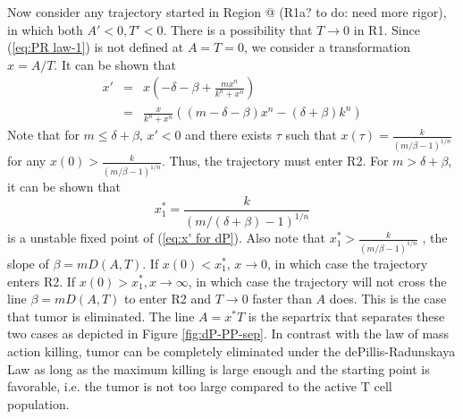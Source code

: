 \documentclass[review,authoryear]{elsarticle}
\makeatletter
\newcommand*{\rom}[1]{\expandafter\@slowromancap\romannumeral #1@}
\makeatother
\begin{document}
Now consider any trajectory started in Region \rom{1} (R1a? to do: need more rigor),
in which both $A'<0,T'<0$. There is a possibility that $T\to0$ in
R1. Since (\ref{eq:PR law-1}) is not defined at $A=T=0$, we consider
a transformation $x=A/T$. It can be shown that 
\begin{eqnarray}
x' & = & x(-\delta-\beta+\frac{mx^{n}}{k^{n}+x^{n}})\label{eq:x' for dP}\\
 & = & \frac{x}{k^{n}+x^{n}}((m-\delta-\beta)x^{n}-(\delta+\beta)k^{n})\nonumber 
\end{eqnarray}
Note that for $m\le\delta+\beta$, $x'<0$ and there exists $\tau$
such that $x(\tau)=\frac{k}{(m/\beta-1)^{1/n}}$ for any $x(0)>\frac{k}{(m/\beta-1)^{1/n}}$.
Thus, the trajectory must enter R2. For $m>\delta+\beta$, it can
be shown that 
\[
x_{1}^{*}=\frac{k}{(m/(\delta+\beta)-1)^{1/n}}
\]
 is a unstable fixed point of (\ref{eq:x' for dP}). Also note that
$x_{1}^{*}>\frac{k}{(m/\beta-1)^{1/n}}$ , the slope of $\beta=mD(A,T)$.
If $x(0)<x_{1}^{*}$, $x\to0$, in which case the trajectory enters
R2. If $x(0)>x_{1}^{*},x\to\infty$, in which case the trajectory
will not cross the line $\beta=mD(A,T)$ to enter R2 and $T\to0$
faster than $A$ does. This is the case that tumor is eliminated.
The line $A=x^{*}T$ is the separtrix that separates these two cases
as depicted in Figure \ref{fig:dP-PP-sep}. In contrast with the law
of mass action killing, tumor can be completely eliminated under the
dePillis-Radunskaya Law as long as the maximum killing is large enough
and the starting point is favorable, i.e. the tumor is not too large
compared to the active T cell population. 
\end{document}
